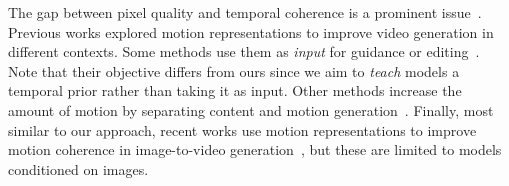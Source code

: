 The gap between pixel quality and temporal coherence is a prominent issue~\cite{Ruan2024Enhancing,sora,sora_review,physics}. 
Previous works explored motion representations to improve video generation in different contexts. Some methods use them as \emph{input} for guidance or editing~\cite{trajectories,trakectory2,liu2024physgen,cong2023flatten}. Note that their objective differs from ours since we aim to \emph{teach} models a temporal prior rather than taking it as input. Other methods increase the amount of motion by separating content and motion generation~\cite{Ruan2024Enhancing,Qing2023Hierarchical}. Finally, most similar to our approach, recent works use motion representations to improve motion coherence in image-to-video generation~\cite{Shi2024MotionI2V,Wang2024MotiF}, but these are limited to models conditioned on images. 